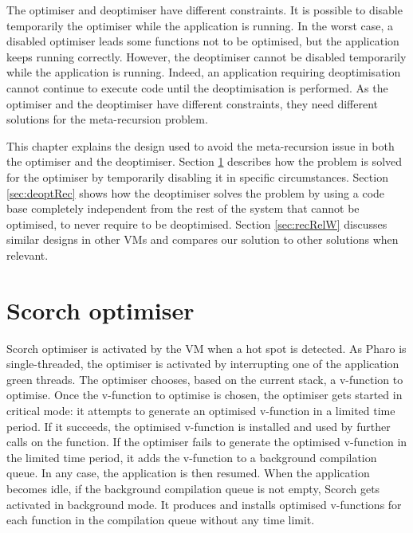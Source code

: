 \documentclass[a4paper,12pt,twoside]{../includes/ThesisStyle}
\begin{document}
The optimiser and deoptimiser have different constraints. It is possible to disable temporarily the optimiser while the application is running. In the worst case, a disabled optimiser leads some functions not to be optimised, but the application keeps running correctly. However, the deoptimiser cannot be disabled temporarily while the application is running. Indeed, an application requiring deoptimisation cannot continue to execute code until the deoptimisation is performed. As the optimiser and the deoptimiser have different constraints, they need different solutions for the meta-recursion problem.

This chapter explains the design used to avoid the meta-recursion issue in both the optimiser and the deoptimiser. Section \ref{sec:optRec} describes how the problem is solved for the optimiser by temporarily disabling it in specific circumstances. Section \ref{sec:deoptRec} shows how the deoptimiser solves the problem by using a code base completely independent from the rest of the system that cannot be optimised, to never require to be deoptimised. Section \ref{sec:recRelW} discusses similar designs in other VMs and compares our solution to other solutions when relevant.


\section{Scorch optimiser}
\label{sec:optRec}

Scorch optimiser is activated by the VM when a hot spot is detected. As Pharo is single-threaded, the optimiser is activated by interrupting one of the application green threads. The optimiser chooses, based on the current stack, a v-function to optimise.  Once the v-function to optimise is chosen, the optimiser gets started in critical mode: it attempts to generate an optimised v-function in a limited time period. If it succeeds, the optimised v-function is installed and used by further calls on the function. If the optimiser fails to generate the optimised v-function in the limited time period, it adds the v-function to a background compilation queue. In any case, the application is then resumed. When the application becomes idle, if the background compilation queue is not empty, Scorch gets activated in background mode. It produces and installs optimised v-functions for each function in the compilation queue without any time limit. 
\end{document}
